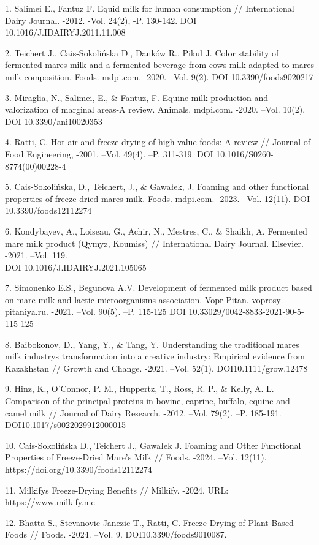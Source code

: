   \begin{noparindent}

1. Salimei E., Fantuz F. Equid milk for human consumption //
International Dairy Journal. -2012. -Vol. 24(2), -P. 130-142. DOI
10.1016/J.IDAIRYJ.2011.11.008

2. Teichert J., Cais-Sokolińska D., Danków R., Pikul J. Color stability
of fermented mare\textquotesingle s milk and a fermented beverage from
cow\textquotesingle s milk adapted to mare\textquotesingle s milk
composition. Foods. mdpi.com. -2020. --Vol. 9(2). DOI
10.3390/foods9020217

3. Miraglia, N., Salimei, E., \& Fantuz, F. Equine milk production and
valorization of marginal areas-A review. Animals. mdpi.com. -2020.
--Vol. 10(2). DOI 10.3390/ani10020353

4. Ratti, C. Hot air and freeze-drying of high-value foods: A review //
Journal of Food Engineering, -2001. --Vol. 49(4). --P. 311-319. DOI
10.1016/S0260-8774(00)00228-4

5. Cais-Sokolińska, D., Teichert, J., \& Gawałek, J. Foaming and other
functional properties of freeze-dried mare\textquotesingle s milk.
Foods. mdpi.com. -2023. --Vol. 12(11). DOI 10.3390/foods12112274

6. Kondybayev, A., Loiseau, G., Achir, N., Mestres, C., \& Shaikh, A.
Fermented mare milk product (Qymyz, Koumiss) // International Dairy
Journal. Elsevier. -2021. --Vol. 119.\\ DOI 10.1016/J.IDAIRYJ.2021.105065

7. Simonenko E.S., Begunova A.V. Development of fermented milk product
based on mare milk and lactic microorganisms association. Vopr Pitan.
voprosy-pitaniya.ru. -2021. --Vol. 90(5). --P. 115-125 DOI
10.33029/0042-8833-2021-90-5-115-125

8. Baibokonov, D., Yang, Y., \& Tang, Y. Understanding the traditional
mares\textquotesingle{} milk industry\textquotesingle s transformation
into a creative industry: Empirical evidence from Kazakhstan // Growth
and Change. -2021. --Vol. 52(1). DOI10.1111/grow.12478

9. Hinz, K., O'Connor, P. M., Huppertz, T., Ross, R. P., \& Kelly, A. L.
Comparison of the principal proteins in bovine, caprine, buffalo, equine
and camel milk // Journal of Dairy Research. -2012. --Vol. 79(2). --P.
185-191. DOI10.1017/s0022029912000015

10. Cais-Sokolińska D., Teichert J., Gawałek J. Foaming and Other
Functional Properties of Freeze-Dried Mare's Milk // Foods. -2024.
--Vol. 12(11). https://doi.org/10.3390/foods12112274

11. Milkify\textquotesingle s Freeze-Drying Benefits // Milkify. -2024.
URL: https://www.milkify.me

12. Bhatta S., Stevanovic Janezic T., Ratti, C. Freeze-Drying of
Plant-Based Foods // Foods. -2024. --Vol. 9. DOI10.3390/foods9010087.

\end{noparindent}


